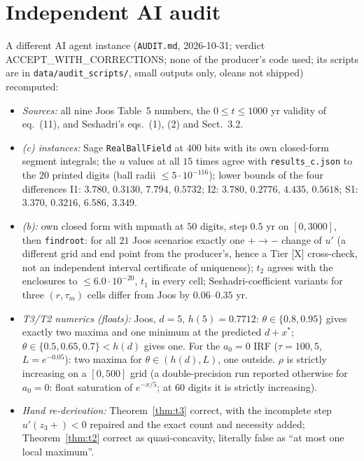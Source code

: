 \documentclass[10pt]{article}
\newcommand{\tier}[1]{\textsf{[#1]}}
\newcommand{\tX}{\tier{X}}
\theoremstyle{plain}
\begin{document}
\section{Independent AI audit}\label{sec:audit}
A different AI agent instance (\texttt{AUDIT.md}, 2026-10-31; verdict ACCEPT\_WITH\_CORRECTIONS; none of the producer's code used; its scripts are in \texttt{data/audit\_scripts/}, small outputs only, oleans not shipped) recomputed:
\begin{itemize}\itemsep=1pt
\item \emph{Sources:} all nine Joos Table~5 numbers, the $0\le t\le1000$ yr validity of eq.~(11), and Seshadri's eqs.\ (1), (2) and Sect.~3.2.
\item \emph{(c) instances:} Sage \texttt{RealBallField} at $400$ bits with its own closed-form segment integrals; the $u$ values at all $15$ times agree with \texttt{results\_c.json} to the $20$ printed digits (ball radii $\le5\cdot10^{-116}$); lower bounds of the four differences I1: $3.780,\,0.3130,\,7.794,\,0.5732$; I2: $3.780,\,0.2776,\,4.435,\,0.5618$; S1: $3.370,\,0.3216,\,6.586,\,3.349$.
\item \emph{(b):} own closed form with mpmath at $50$ digits, step $0.5$ yr on $[0,3000]$, then \texttt{findroot}: for all $21$ Joos scenarios exactly one $+\to-$ change of $u'$ (a different grid and end point from the producer's, hence a Tier \tX{} cross-check, not an independent interval certificate of uniqueness); $t_2$ agrees with the enclosures to $\le6.0\cdot10^{-20}$, $t_1$ in every cell; Seshadri-coefficient variants for three $(r,\tau_m)$ cells differ from Joos by $0.06$--$0.35$ yr.
\item \emph{T3/T2 numerics (floats):} Joos, $d=5$, $h(5)=0.7712$: $\theta\in\{0.8,0.95\}$ gives exactly two maxima and one minimum at the predicted $d+x^*$; $\theta\in\{0.5,0.65,0.7\}<h(d)$ gives one. For the $a_0=0$ IRF ($\tau=100,5$, $L=e^{-0.05}$): two maxima for $\theta\in(h(d),L)$, one outside. $\rho$ is strictly increasing on a $[0,500]$ grid (a double-precision run reported otherwise for $a_0=0$: float saturation of $e^{-x/5}$; at $60$ digits it is strictly increasing).
\item \emph{Hand re-derivation:} Theorem~\ref{thm:t3} correct, with the incomplete step $u'(z_3+)<0$ repaired and the exact count and necessity added; Theorem~\ref{thm:t2} correct as quasi-concavity, literally false as ``at most one local maximum''.
\end{itemize}

\end{document}
